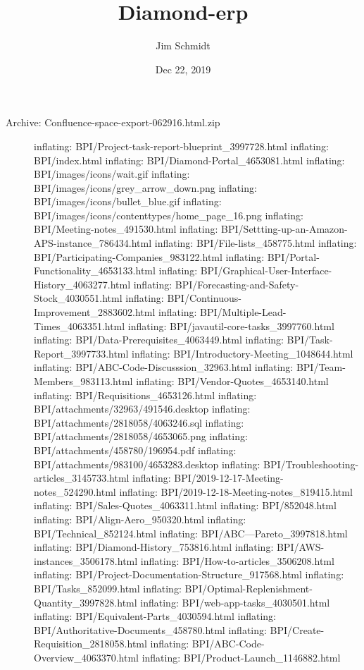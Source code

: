 \documentclass[letterpaper,10pt,english]{sphinxmanual}
\title{Diamond-erp}
\date{Dec 22, 2019}
\author{Jim Schmidt}
\begin{document}
\pagestyle{empty}
\sphinxmaketitle
\pagestyle{plain}
\sphinxtableofcontents
\pagestyle{normal}
\label{\detokenize{index::doc}}\begin{description}
\item[{Archive:  Confluence-space-export-062916.html.zip}] \leavevmode
inflating: BPI/Project-task-report-blueprint\_3997728.html
inflating: BPI/index.html
inflating: BPI/Diamond-Portal\_4653081.html
inflating: BPI/images/icons/wait.gif
inflating: BPI/images/icons/grey\_arrow\_down.png
inflating: BPI/images/icons/bullet\_blue.gif
inflating: BPI/images/icons/contenttypes/home\_page\_16.png
inflating: BPI/Meeting-notes\_491530.html
inflating: BPI/Settting-up-an-Amazon-APS-instance\_786434.html
inflating: BPI/File-lists\_458775.html
inflating: BPI/Participating-Companies\_983122.html
inflating: BPI/Portal-Functionality\_4653133.html
inflating: BPI/Graphical-User-Interface-History\_4063277.html
inflating: BPI/Forecasting-and-Safety-Stock\_4030551.html
inflating: BPI/Continuous-Improvement\_2883602.html
inflating: BPI/Multiple-Lead-Times\_4063351.html
inflating: BPI/javautil-core-tasks\_3997760.html
inflating: BPI/Data-Prerequisites\_4063449.html
inflating: BPI/Task-Report\_3997733.html
inflating: BPI/Introductory-Meeting\_1048644.html
inflating: BPI/ABC-Code-Discusssion\_32963.html
inflating: BPI/Team-Members\_983113.html
inflating: BPI/Vendor-Quotes\_4653140.html
inflating: BPI/Requisitions\_4653126.html
inflating: BPI/attachments/32963/491546.desktop
inflating: BPI/attachments/2818058/4063246.sql
inflating: BPI/attachments/2818058/4653065.png
inflating: BPI/attachments/458780/196954.pdf
inflating: BPI/attachments/983100/4653283.desktop
inflating: BPI/Troubleshooting-articles\_3145733.html
inflating: BPI/2019-12-17-Meeting-notes\_524290.html
inflating: BPI/2019-12-18-Meeting-notes\_819415.html
inflating: BPI/Sales-Quotes\_4063311.html
inflating: BPI/852048.html
inflating: BPI/Align-Aero\_950320.html
inflating: BPI/Technical\_852124.html
inflating: BPI/ABC—Pareto\_3997818.html
inflating: BPI/Diamond-History\_753816.html
inflating: BPI/AWS-instances\_3506178.html
inflating: BPI/How-to-articles\_3506208.html
inflating: BPI/Project-Documentation-Structure\_917568.html
inflating: BPI/Tasks\_852099.html
inflating: BPI/Optimal-Replenishment-Quantity\_3997828.html
inflating: BPI/web-app-tasks\_4030501.html
inflating: BPI/Equivalent-Parts\_4030594.html
inflating: BPI/Authoritative-Documents\_458780.html
inflating: BPI/Create-Requisition\_2818058.html
inflating: BPI/ABC-Code-Overview\_4063370.html
inflating: BPI/Product-Launch\_1146882.html

\end{description}
\end{document}
